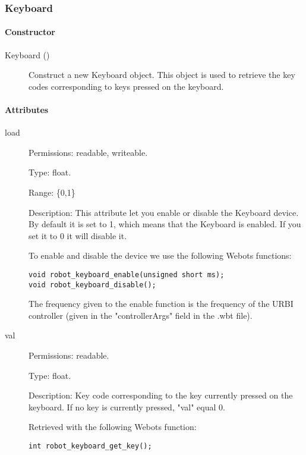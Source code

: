 \subsubsection{Keyboard}
\label{webots.uobjects.robotdevices.keyboard}%

\paragraph{Constructor}
\label{webots.uobjects.robotdevices.keyboard.constructor}%

\noindent
\begin{description}
\item[{Keyboard ()}]      Construct a new Keyboard object. This object is used to retrieve the
          key codes corresponding to keys pressed on the keyboard.

\end{description}

\paragraph{Attributes}
\label{webots.uobjects.robotdevices.keyboard.attributes}%

\noindent
\begin{description}
\item[{load}]     Permissions: readable, writeable.


  Type: float.


  Range: \{0,1\}


  Description: This attribute let you enable or disable the Keyboard
  device.  By default it is set to 1, which means that the Keyboard is
  enabled. If you set it to 0 it will disable it.


          To enable and disable the device we use the following Webots functions:


\begin{lstlisting}
void robot_keyboard_enable(unsigned short ms);
void robot_keyboard_disable();
\end{lstlisting}

          The frequency given to the enable function is the frequency of the
          URBI controller (given in the "controllerArgs" field in the .wbt file).

\item[{         val
 }]            Permissions: readable.


 Type: float.


 Description: Key code corresponding to the key currently pressed on
 the keyboard. If no key is currently pressed, "val" equal 0.


          Retrieved with the following Webots function:


\begin{lstlisting}
int robot_keyboard_get_key();
\end{lstlisting}
\end{description}

